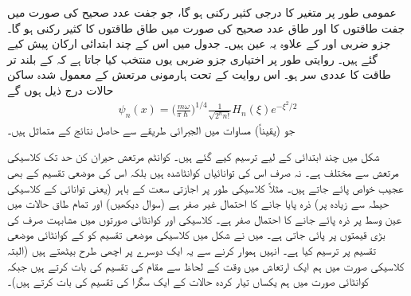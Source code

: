  عمومی طور پر  متغیر  کا  درجی کثیر رکنی ہو گا، جو جفت عدد صحیح  کی صورت میں جفت طاقتوں کا اور طاق عدد صحیح  کی صورت میں طاق طاقتوں کا کثیر رکنی ہو گا۔  جزو ضربی  اور 
کے علاوہ یہ عین   ہیں۔ جدول  میں اس کے چند ابتدائی ارکان پیش کیے  گئے ہیں۔ روایتی طور پر اختیاری جزو ضربی  یوں منتخب کیا جاتا ہے کہ  کے بلند تر طاقت کا عددی سر  ہو۔ اس روایت کے تحت ہارمونی مرتعش کے معمول شدہ ساکن حالات درج ذیل ہوں گے
\begin{align}
\psi_{n}(x)=\big (\frac{m\omega}{\pi\hslash}\big )^{1/4}\frac{1}{\sqrt{2^{n}n!}}H_{n}(\xi)e^{-\xi^{2}/2}
\end{align}
جو (یقیناً) مساوات  میں الجبرائی طریقے سے حاصل نتائج کے  متماثل ہیں۔

 شکل  میں  چند ابتدائی  کے لیے  ترسیم کیے گئے ہیں۔ کوانٹم مرتعش حیران کن حد تک کلاسیکی  مرتعش سے مختلف ہے۔ نہ صرف اس کی توانائیاں کوانٹاشدہ ہیں بلکہ اس کی  موضعی تقسیم  کے بھی عجیب خواص پائے جاتے ہیں۔ مثلاً  کلاسیکی طور پر اجازتی سعت کے باہر (یعنی توانائی کے کلاسیکی حیطہ سے زیادہ  پر) ذرہ پایا جانے کا احتمال غیر صفر ہے (سوال  دیکھیں) اور تمام طاق حالات میں عین وسط پر ذرہ پائے جانے کا احتمال صفر ہے۔ کلاسیکی اور کوانٹائی صورتوں میں مشابہت صرف  کی بڑی قیمتوں پر  پائی جاتی ہے۔ میں نے شکل  میں   کلاسیکی موضعی تقسیم کو  کے  کوانٹائی موضعی تقسیم پر ترسیم کیا ہے۔ انہیں ہموار کرنے سے یہ ایک دوسرے پر اچھی طرح بیٹھتے ہیں (البتہ  کلاسیکی صورت میں ہم ایک ارتعاش میں وقت کے لحاظ سے مقام کی تقسیم  کی بات کرتے ہیں جبکہ کوانٹائی صورت میں ہم  یکساں تیار کردہ حالات کے ایک سگرا کی تقسیم کی بات کرتے ہیں)۔

